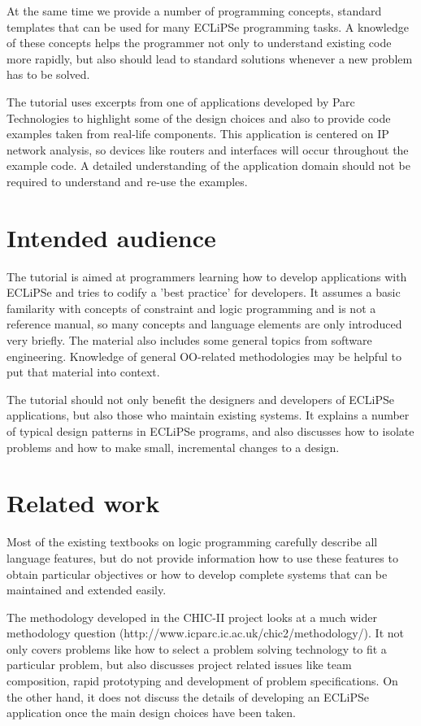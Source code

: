 \documentclass[a4paper,12pt]{report}
\begin{document}
At the same time we provide a number of programming concepts, standard templates that can be used for many ECLiPSe programming tasks. A knowledge of these concepts helps the programmer not only to understand existing code more rapidly, but also should lead to standard solutions whenever a new problem has to be solved.

The tutorial uses excerpts from one of applications developed by Parc Technologies to highlight some of the design choices and also to provide code examples taken from real-life components. This application is centered on IP network analysis, so devices like routers and interfaces will occur throughout the example code. A detailed understanding of the application domain should not be required to understand and re-use the examples.

\section{Intended audience}
The tutorial is aimed at programmers learning how to develop applications with ECLiPSe and tries to codify a 'best practice' for developers. It assumes a basic familarity with concepts of constraint and logic programming and is not a reference manual, so many concepts and language elements are only introduced very briefly. The material also includes some general topics from software engineering. Knowledge of general OO-related methodologies may be helpful to put that material into context.

The tutorial should not only benefit the designers and developers of ECLiPSe applications, but also those who maintain existing systems. It explains a number of typical design patterns in ECLiPSe programs, and also discusses how to isolate problems and how to make small, incremental changes to a design.

\section{Related work}
Most of the existing textbooks on logic programming carefully describe all language features, but do not provide information how to use these features to obtain particular objectives or how to develop complete systems that can be maintained and extended easily. 
 
The methodology developed in the CHIC-II project  looks at a much wider methodology question (http://www.icparc.ic.ac.uk/chic2/methodology/). It not only covers problems like how to select a problem solving technology to fit a particular problem, but also discusses project related issues like team composition, rapid prototyping and development of problem specifications. On the other hand, it does not discuss the details of developing an ECLiPSe application once the main design choices have been taken.
\end{document}
